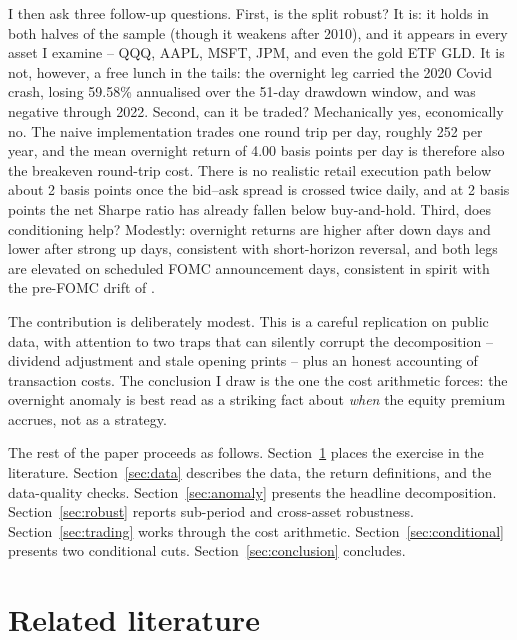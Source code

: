 \documentclass[11pt]{article}
\begin{document}
I then ask three follow-up questions. First, is the split robust? It is: it holds in both halves of the sample (though it weakens after 2010), and it appears in every asset I examine -- QQQ, AAPL, MSFT, JPM, and even the gold ETF GLD. It is not, however, a free lunch in the tails: the overnight leg carried the 2020 Covid crash, losing 59.58\% annualised over the 51-day drawdown window, and was negative through 2022. Second, can it be traded? Mechanically yes, economically no. The naive implementation trades one round trip per day, roughly 252 per year, and the mean overnight return of 4.00 basis points per day is therefore also the breakeven round-trip cost. There is no realistic retail execution path below about 2 basis points once the bid--ask spread is crossed twice daily, and at 2 basis points the net Sharpe ratio has already fallen below buy-and-hold. Third, does conditioning help? Modestly: overnight returns are higher after down days and lower after strong up days, consistent with short-horizon reversal, and both legs are elevated on scheduled FOMC announcement days, consistent in spirit with the pre-FOMC drift of \citet{lucca2015}.

The contribution is deliberately modest. This is a careful replication on public data, with attention to two traps that can silently corrupt the decomposition -- dividend adjustment and stale opening prints -- plus an honest accounting of transaction costs. The conclusion I draw is the one the cost arithmetic forces: the overnight anomaly is best read as a striking fact about \emph{when} the equity premium accrues, not as a strategy.

The rest of the paper proceeds as follows. Section~\ref{sec:lit} places the exercise in the literature. Section~\ref{sec:data} describes the data, the return definitions, and the data-quality checks. Section~\ref{sec:anomaly} presents the headline decomposition. Section~\ref{sec:robust} reports sub-period and cross-asset robustness. Section~\ref{sec:trading} works through the cost arithmetic. Section~\ref{sec:conditional} presents two conditional cuts. Section~\ref{sec:conclusion} concludes.

\section{Related literature}
\label{sec:lit}
\end{document}
